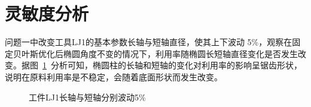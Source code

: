 \documentclass{whutmod}
\begin{document}
  	\section{灵敏度分析}
  	问题一中改变工具LJ1的基本参数长轴与短轴直径，使其上下波动 5\%，观察在固定贝叶斯优化后椭圆角度不变的情况下，利用率随椭圆长短轴直径变化是否发生改变。据图~\ref{adad}~分析可知，椭圆柱的长轴和短轴的变化对利用率的影响呈锯齿形状，说明在原料利用率是不稳定，会随着底面形状而发生改变。
  	
   \begin{figure}[H]
 	\centering
 	\caption{工件LJ1长轴与短轴分别波动5\%}\label{adad}
 \end{figure}
   	
\end{document}
